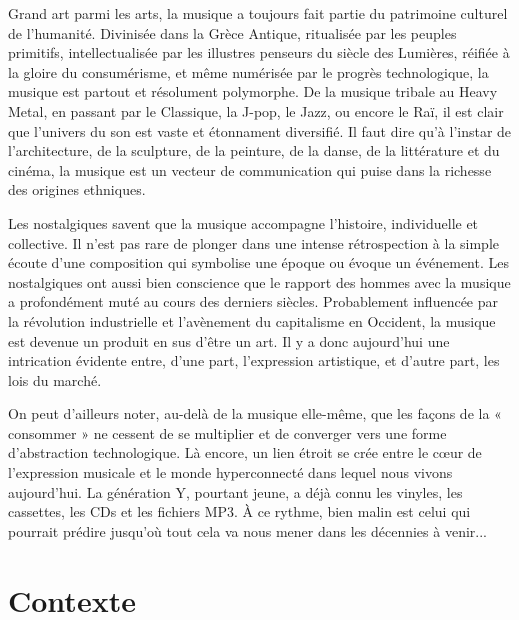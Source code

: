 \documentclass[a4paper,12pt]{article}
\begin{document}
Grand art parmi les arts, la musique a toujours fait partie du patrimoine culturel de l'humanité. Divinisée dans la Grèce Antique, ritualisée par les peuples primitifs, intellectualisée par les illustres penseurs du siècle des Lumières, réifiée à la gloire du consumérisme, et même numérisée par le progrès technologique, la musique est partout et résolument polymorphe. De la musique tribale au Heavy Metal, en passant par le Classique, la J-pop, le Jazz, ou encore le Raï, il est clair que l'univers du son est vaste et étonnament diversifié. Il faut dire qu'à l'instar de l'architecture, de la sculpture, de la peinture, de la danse, de la littérature et du cinéma, la musique est un vecteur de communication qui puise dans la richesse des origines ethniques.

Les nostalgiques savent que la musique accompagne l'histoire, individuelle et collective. Il n'est pas rare de plonger dans une intense rétrospection à la simple écoute d'une composition qui symbolise une époque ou évoque un événement. Les nostalgiques ont aussi bien conscience que le rapport des hommes avec la musique a profondément muté au cours des derniers siècles. Probablement influencée par la révolution industrielle et l'avènement du capitalisme en Occident, la musique est devenue un produit en sus d'être un art. Il y a donc aujourd'hui une intrication évidente entre, d'une part, l'expression artistique, et d'autre part, les lois du marché.

On peut d'ailleurs noter, au-delà de la musique elle-même, que les façons de la « consommer » ne cessent de se multiplier et de converger vers une forme d'abstraction technologique. Là encore, un lien étroit se crée entre le cœur de l'expression musicale et le monde hyperconnecté dans lequel nous vivons aujourd'hui. La génération Y, pourtant jeune, a déjà connu les vinyles, les cassettes, les CDs et les fichiers MP3. À ce rythme, bien malin est celui qui pourrait prédire jusqu'où tout cela va nous mener dans les décennies à venir...

\newpage


\part{Contexte}
\end{document}
